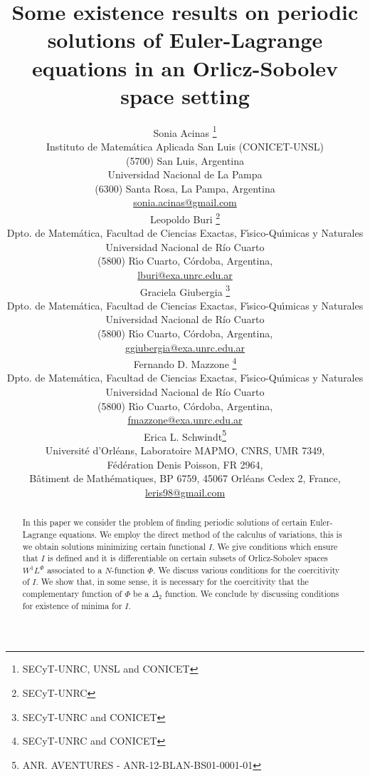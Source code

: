 \documentclass[twoside]{article}
\title{Some existence results on periodic solutions of 
Euler-Lagrange equations in an Orlicz-Sobolev space setting}
\author{Sonia Acinas \thanks{SECyT-UNRC, UNSL and CONICET}\\
Instituto de Matem\'atica Aplicada San Luis (CONICET-UNSL)\\
(5700) San Luis, Argentina\\
Universidad Nacional de La Pampa\\
(6300) Santa Rosa, La Pampa, Argentina\\
\url{sonia.acinas@gmail.com}\\[3mm]
Leopoldo Buri \thanks{SECyT-UNRC}\\
Dpto. de Matem\'atica, Facultad de Ciencias Exactas, F\'{\i}sico-Qu\'{\i}micas y Naturales\\
Universidad Nacional de R\'{i}o Cuarto\\
(5800) R\'{\i}o Cuarto, C\'ordoba, Argentina,\\
\url{lburi@exa.unrc.edu.ar}\\[3mm]
Graciela Giubergia \thanks{SECyT-UNRC and CONICET}\\
Dpto. de Matem\'atica, Facultad de Ciencias Exactas, F\'{\i}sico-Qu\'{\i}micas y Naturales\\
Universidad Nacional de R\'{i}o Cuarto\\
(5800) R\'{\i}o Cuarto, C\'ordoba, Argentina,\\
\url{ggiubergia@exa.unrc.edu.ar}\\[3mm]
Fernando D. Mazzone \thanks{SECyT-UNRC and CONICET}\\
Dpto. de Matem\'atica, Facultad de Ciencias Exactas, F\'{\i}sico-Qu\'{\i}micas y Naturales\\
Universidad Nacional de R\'{i}o Cuarto\\
(5800) R\'{\i}o Cuarto, C\'ordoba, Argentina,\\
\url{fmazzone@exa.unrc.edu.ar}\\[3mm]
Erica L. Schwindt\thanks{ANR. AVENTURES - ANR-12-BLAN-BS01-0001-01}\\
Universit\'{e} d'{O}rl\'{e}ans, Laboratoire MAPMO, CNRS, UMR 7349, \\
F\'ed\'eration Denis Poisson, FR 2964,\\
B\^{a}timent de Math\'{e}matiques, BP 6759, 45067 Orl\'{e}ans Cedex 2, France,\\
\url{leris98@gmail.com}}
\date{}
\theoremstyle{remark}
\begin{document}
\maketitle
%
\begingroup%
    \renewcommand{\thefootnote}{}%
    \endgroup
%
%
%
%

\begin{abstract}
In this paper we consider the problem of finding periodic solutions of certain Euler-Lagrange equations. We employ the direct method of the calculus of variations, this is we obtain solutions minimizing certain functional $I$. We give conditions which ensure that $I$ is defined and it is  differentiable on certain subsets of  Orlicz-Sobolev spaces $W^1L^{\Phi}$ associated to a $N$-function $\Phi$. We discuss various conditions for the  coercitivity of $I$. We show that, in some sense, it is necessary for the coercitivity that  the complementary function of $\Phi$ be a $\Delta_2$ function.  We conclude by discussing conditions for existence of minima for $I$. 
\end{abstract}




\pagestyle{fancy} \headheight 35pt \fancyhead{} \fancyfoot{}

\fancyfoot[C]{\thepage}  \fancyhead[CO]{\nouppercase{\section}}

\fancyhead[CO]{\nouppercase{\leftmark}}


\end{document}
